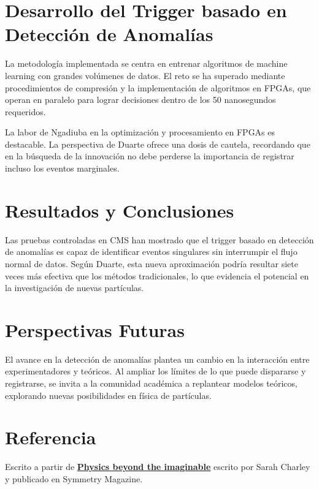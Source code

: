 \documentclass[a4paper,12pt]{article}
\begin{document}
\section{Desarrollo del Trigger basado en Detección de Anomalías}
La metodología implementada se centra en entrenar algoritmos de machine learning con grandes volúmenes de datos. El reto se ha superado mediante procedimientos de compresión y la implementación de algoritmos en FPGAs, que operan en paralelo para lograr decisiones dentro de los 50 nanosegundos requeridos.

La labor de Ngadiuba en la optimización y procesamiento en FPGAs es destacable. La perspectiva de Duarte ofrece una dosis de cautela, recordando que en la búsqueda de la innovación no debe perderse la importancia de registrar incluso los eventos marginales.

\section{Resultados y Conclusiones}
Las pruebas controladas en CMS han mostrado que el trigger basado en detección de anomalías es capaz de identificar eventos singulares sin interrumpir el flujo normal de datos. Según Duarte, esta nueva aproximación podría resultar siete veces más efectiva que los métodos tradicionales, lo que evidencia el potencial en la investigación de nuevas partículas.

\section{Perspectivas Futuras}
El avance en la detección de anomalías plantea un cambio en la interacción entre experimentadores y teóricos. Al ampliar los límites de lo que puede dispararse y registrarse, se invita a la comunidad académica a replantear modelos teóricos, explorando nuevas posibilidades en física de partículas.

\section{Referencia}
Escrito a partir de \href{https://www.symmetrymagazine.org/article/physics-beyond-the-imaginable?language_content_entity=und}{\textbf{Physics beyond the imaginable}} escrito por Sarah Charley y publicado en Symmetry Magazine.
\end{document}
